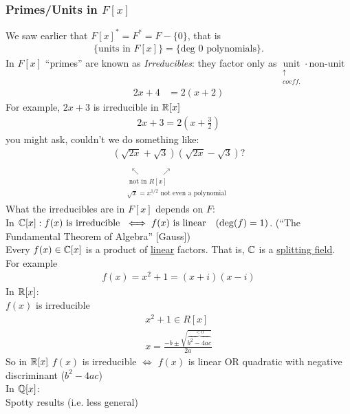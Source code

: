 \subsubsection*{Primes/Units in $F[x]$}
We saw earlier that $F[x]^*=F^* = F-\{0\}$, that is 
\begin{align*}
    \{\text{units in }F[x]\}= \{\text{deg }0 \text{ polynomials}\}.
\end{align*}
In $F[x]$ ``primes'' are known as \textit{Irreducibles}: they factor only as $\underset{\substack{\uparrow \\ coeff.}}{\text{unit}}\cdot\text{non-unit}$
\begin{align*}
    2x+4 &= 2(x+2)
\end{align*}
For example, $2x+3$ is irreducible in ${\mathbb{ R}}[x]$
\begin{align*}
    2x+3 = 2\left(x+\frac{3}{2}\right)
\end{align*}
you might ask, couldn't we do something like:
\begin{align*}
    \underset{\substack{\\ \\ \ \ \nwarrow \ \ \ \ \ \ \ \ \ \ \ \ \ \ \nearrow \\ \text{ not in }R[x] \\ \sqrt{x}=x^{1/2} \text{ not even a polynomial}}}{(\sqrt{2x}+\sqrt{3})(\sqrt{2x}-\sqrt{3})} ?
\end{align*}
What the irreducibles are in $F[x]$ depends on $F$:\\
In ${\mathbb{ C}}[x]: \\
f(x) \text{ is irreducible } \iff f(x) \text{ is linear } \ \ (\deg(f) =1)$. (``The Fundamental Theorem of Algebra'' [Gauss]) \\
Every $f(x) \in {\mathbb{ C}}[x]$ is a product of \ul{linear} factors. That is, ${\mathbb{ C}}$ is a \ul{splitting field}. \\
For example 
\begin{align*}
    f(x)=x^2+1 = (x+i)(x-i)
\end{align*}
In ${\mathbb{ R}}[x]$: \\
$f(x)$ is irreducible
\begin{align*}
    x^2+1\in R[x] \\
    x= \frac{-b \pm \sqrt{\overbrace{b^2-4ac}^{<0}}}{2a}
\end{align*}
So in ${\mathbb{ R}}[x]$ $f(x)$ is irreducible $\iff$ $f(x)$ is linear OR quadratic with negative discriminant ($b^2-4ac$)\\
\noindent In ${\mathbb{ Q}}[x]$: \\
Spotty results (i.e. less general)
